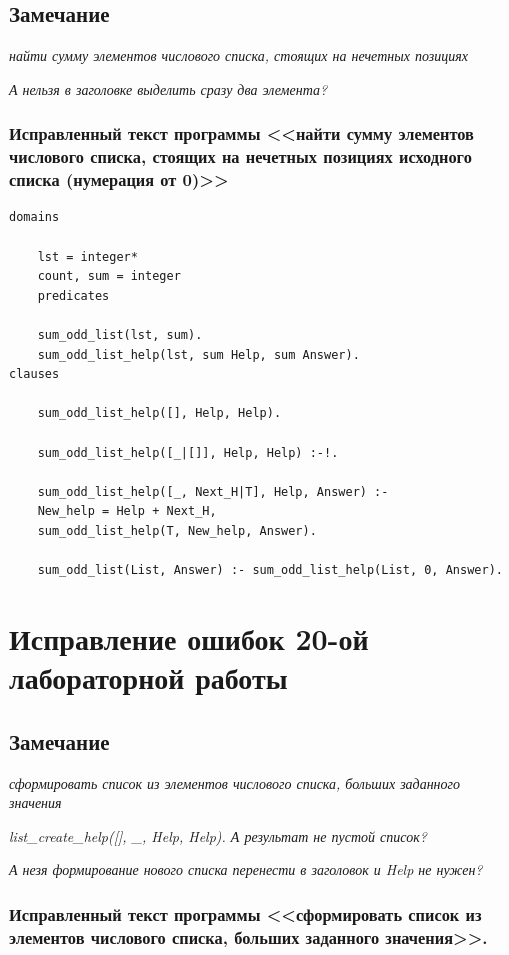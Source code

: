 \documentclass[a4paper,12pt]{article}
\begin{document}
	\subsection*{Замечание}
	
	\textit{найти сумму элементов числового списка, стоящих на нечетных позициях}
	
	\textit{А нельзя в заголовке выделить сразу два элемента?}
	
	\subsubsection*{Исправленный текст программы <<найти сумму элементов числового списка, стоящих на нечетных позициях исходного списка (нумерация от 0)>>}
	
	\begin{verbatim}
domains
	
	lst = integer*
	count, sum = integer
	predicates
	
	sum_odd_list(lst, sum).
	sum_odd_list_help(lst, sum Help, sum Answer).
clauses
	
	sum_odd_list_help([], Help, Help).
	
	sum_odd_list_help([_|[]], Help, Help) :-!.
	
	sum_odd_list_help([_, Next_H|T], Help, Answer) :-
	New_help = Help + Next_H, 
	sum_odd_list_help(T, New_help, Answer).
	
	sum_odd_list(List, Answer) :- sum_odd_list_help(List, 0, Answer).
	\end{verbatim}
	
	
	\section*{Исправление ошибок 20-ой лабораторной работы}
	
	\subsection*{Замечание}
	
	\textit{сформировать список из элементов числового списка, больших заданного значения}
	
	\textit{list\_create\_help([], \_, Help, Help). А результат не пустой список?}
	
	\textit{А незя формирование нового списка перенести в заголовок и Help не нужен?}
	
	\subsubsection*{Исправленный текст программы <<сформировать список из элементов числового списка, больших заданного значения>>.}
	
\end{document}
